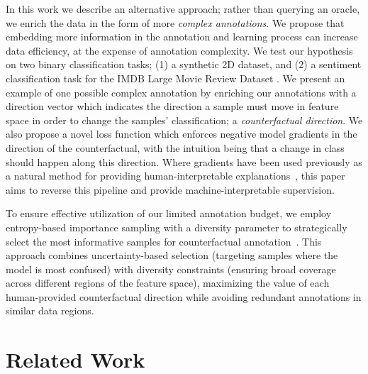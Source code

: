 \documentclass[sigconf,anonymous]{aamas}
\begin{document}
In this work we describe an alternative approach; rather than querying an oracle, we enrich the data in the form of more \emph{complex annotations}. We propose that embedding more information in the annotation and learning process can increase data efficiency, at the expense of annotation complexity. We test our hypothesis on two binary classification tasks; (1) a synthetic 2D dataset, and (2) a sentiment classification task for the IMDB Large Movie Review Dataset \cite{imdb}. We present an example of one possible complex annotation by enriching our annotations with a direction vector which indicates the direction a sample must move in feature space in order to change the samples' classification; a \emph{counterfactual direction}. We also propose a novel loss function which enforces negative model gradients in the direction of the counterfactual, with the intuition being that a change in class should happen along this direction. Where gradients have been used previously as a natural method for providing human-interpretable explanations~\cite{simonyan2013deep}, this paper aims to reverse this pipeline and provide machine-interpretable supervision.

To ensure effective utilization of our limited annotation budget, we employ entropy-based importance sampling with a diversity parameter to strategically select the most informative samples for counterfactual annotation~\cite{he2014active}. This approach combines uncertainty-based selection (targeting samples where the model is most confused) with diversity constraints (ensuring broad coverage across different regions of the feature space), maximizing the value of each human-provided counterfactual direction while avoiding redundant annotations in similar data regions. 

\section{Related Work}
\label{related_work}


\end{document}
